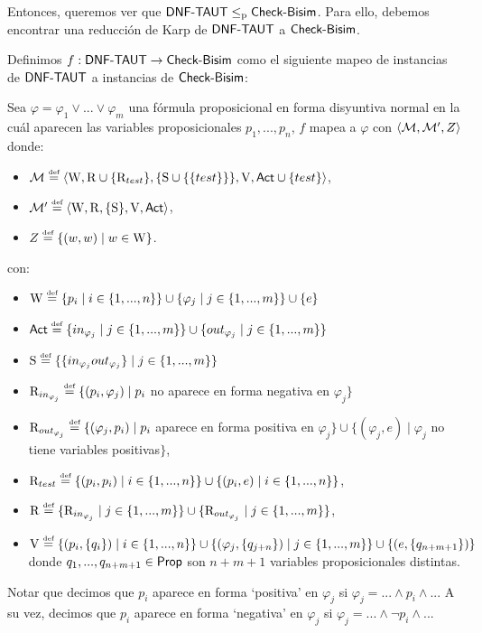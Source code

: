 Entonces, queremos ver que $\rm\textsf{DNF-TAUT} \leq_p \rm\textsf{Check-Bisim}$. Para ello, debemos encontrar una reducción de Karp de $\rm\textsf{DNF-TAUT}$ a $\rm\textsf{Check-Bisim}$.

\begin{definicion}\label{def:karp-reduction}
    Definimos $f : \rm\textsf{DNF-TAUT} \rightarrow \rm\textsf{Check-Bisim}$ como el siguiente mapeo de instancias de $\rm\textsf{DNF-TAUT}$ a instancias de $\rm\textsf{Check-Bisim}$:

    Sea $\varphi = \varphi_1 \vee ... \vee \varphi_m$ una fórmula proposicional en forma disyuntiva normal en la cuál aparecen las variables 
    proposicionales $p_1,...,p_n$, $f$ mapea a $\varphi$ con $\langle \mathcal{M},\mathcal{M}',Z \rangle$ donde:
    \begin{itemize}
        \item $\model \eqdef \tup{\W, \R \cup \{\R_{test}\}, \{\S \cup \{\{test\}\}\}, \V, \ACT \cup \{test\}}$,
        \item $\model' \eqdef \tup{\W, \R, \{\S\}, \V, \ACT}$,
        \item $Z \eqdef \{(w,w) \mid w \in \W\}$.
    \end{itemize}
    con:
    \begin{itemize}
        \item $\W \eqdef \{p_i\mid i\in\{1,...,n\}\} \cup \{\varphi_j \mid j \in \{1,...,m\}\} \cup \{e\}$
        \item $\ACT \eqdef \{in_{\varphi_j} \mid j \in \{1,...,m\}\} \cup \{out_{\varphi_j} \mid j \in \{1,...,m\}\}$
        \item $\S \eqdef \{\{in_{\varphi_j}out_{\varphi_j}\} \mid j \in \{1,...,m\}\}$
        \item $\R_{in_{\varphi_j}} \eqdef \{(p_i,\varphi_j) \mid p_i$ no aparece en forma negativa en $\varphi_j\}$
        \item $\R_{out_{\varphi_j}} \eqdef \{(\varphi_j,p_i) \mid p_i$ aparece en forma positiva en $\varphi_j\} \cup \{(\varphi_j,e) \mid \varphi_j$ no tiene variables positivas$\}$,        
        \item $\R_{test} \eqdef \{(p_i,p_i) \mid i \in \{1,...,n\}\} \cup \{(p_i,e)\mid i\in \{1,...,n\}\}$,
        \item $\R \eqdef \{\R_{in_{\varphi_j}}\mid j \in \{1,...,m\}\} \cup \{\R_{out_{\varphi_j}}\mid j \in \{1,...,m\}\}$,
        \item $\V \eqdef \{(p_i,\{q_i\}) \mid i \in \{1,...,n\}\} \cup 
                     \{(\varphi_j,\{q_{j+n}\}) \mid j \in \{1,...,m\}\} \cup 
                     \{(e,\{q_{n+m+1}\})\}$ donde $q_1,...,q_{n+m+1} \in {\rm \sf Prop}$ son $n+m+1$ variables proposicionales distintas.
    \end{itemize}
    Notar que decimos que $p_i$ aparece en forma `positiva' en $\varphi_j$ si $\varphi_j = ... \wedge p_i \wedge...$
    A su vez, decimos que $p_i$ aparece en forma `negativa' en $\varphi_j$ si $\varphi_j = ...\wedge \neg p_i \wedge...$


\end{definicion}
